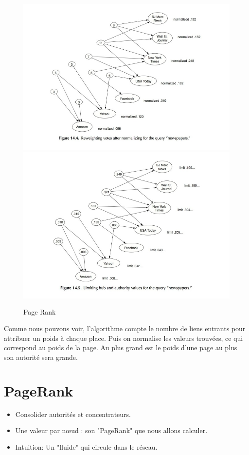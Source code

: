\begin{figure}
\centering

\includegraphics[scale=0.45]{images/ref/fig-14-4.jpeg}
\includegraphics[scale=0.45]{images/ref/fig-14-5.jpeg}
\caption{Page Rank}
\label{pageRankNews2}
\end{figure}



\newpage

	
Comme nous pouvons voir, l'algorithme compte le nombre de liens entrants pour attribuer un poids à chaque place. Puis on normalise les valeurs trouvées, ce qui correspond au poids de la page.
Au plus grand est le poids d'une page au plus son autorité sera grande.

\section{PageRank}
\begin{itemize}
	\item Consolider autorités et concentrateurs.
	\item Une valeur par nœud : son "PageRank" que nous allons calculer. 
	\item Intuition: Un "fluide" qui circule dans le réseau. 
\end{itemize}

